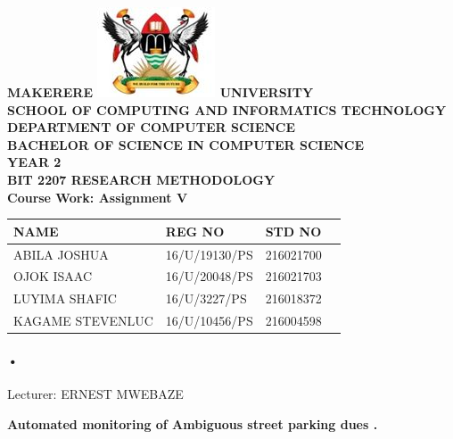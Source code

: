 \documentclass[12pt]{article}
\begin{document}
\begin{Huge}
\begin{center}
\begin{normalsize}
\textbf{MAKERERE \includegraphics[scale=0.5]{logo} UNIVERSITY }\\

\textbf{SCHOOL OF COMPUTING AND INFORMATICS TECHNOLOGY} \\
\textbf{DEPARTMENT OF COMPUTER SCIENCE} \\
\textbf{BACHELOR OF SCIENCE IN COMPUTER SCIENCE} \\
\textbf{YEAR 2} \\
\textbf{BIT 2207 RESEARCH METHODOLOGY} \\
\textbf{Course Work: Assignment V}
\end{normalsize}
\end{center}
\end{Huge}

\begin{center}
\begin{tabular}{|l|l|l|c|}
\hline NAME  & REG NO & STD NO \\\hline
ABILA JOSHUA& 16/U/19130/PS & 216021700 \\\hline
OJOK ISAAC& 16/U/20048/PS& 216021703 \\\hline
LUYIMA SHAFIC& 16/U/3227/PS	 & 216018372 \\\hline
KAGAME STEVENLUC&16/U/10456/PS  & 216004598\\\hline
\end{tabular}

\paragraph{•}
Lecturer: ERNEST MWEBAZE \\


\end{center}

\newpage

\begin{center}
\textbf{\sc Automated monitoring of Ambiguous  street parking dues .}\\
\end{center}
\end{document}
